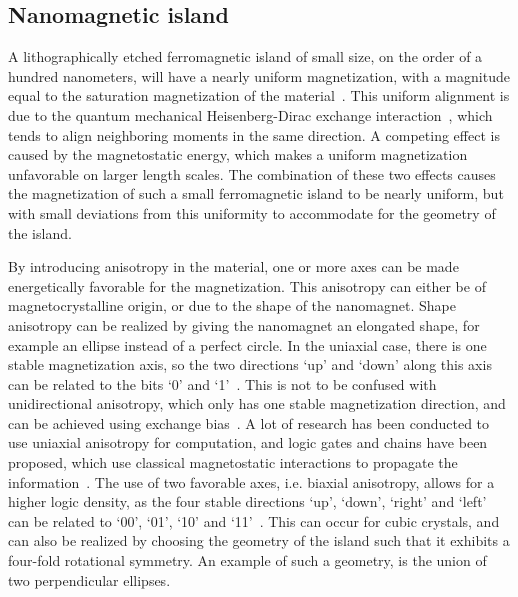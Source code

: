 \documentclass[11pt,a4paper,english,twoside]{article}
\begin{document}
\subsection{Nanomagnetic island}
A lithographically etched ferromagnetic island of small size, on the order of a hundred nanometers, will have a nearly uniform magnetization, with a magnitude equal to the saturation magnetization of the material~\cite{MQCA_RoomTemp,NML_Carlton}. This uniform alignment is due to the quantum mechanical Heisenberg-Dirac exchange interaction~\cite{MuMax3_advances, heisenberg1928theorie}, which tends to align neighboring moments in the same direction. A competing effect is caused by the magnetostatic energy, which makes a uniform magnetization unfavorable on larger length scales. The combination of these two effects causes the magnetization of such a small ferromagnetic island to be nearly uniform, but with small deviations from this uniformity to accommodate for the geometry of the island. \par
By introducing anisotropy in the material, one or more axes can be made energetically favorable for the magnetization. This anisotropy can either be of magnetocrystalline origin, or due to the shape of the nanomagnet. Shape anisotropy can be realized by giving the nanomagnet an elongated shape, for example an ellipse instead of a perfect circle. In the uniaxial case, there is one stable magnetization axis, so the two directions `up' and `down' along this axis can be related to the bits `0' and `1'~\cite{MQCA_RoomTemp}. This is not to be confused with unidirectional anisotropy, which only has one stable magnetization direction, and can be achieved using exchange bias~\cite{ExchangeBias_Mechanisms,ExchangeBias_nanostructures,ExchangeBias}. A lot of research has been conducted to use uniaxial anisotropy for computation, and logic gates and chains have been proposed, which use classical magnetostatic interactions to propagate the information~\cite{GYP-18,MQCA_MajorityGate,SwitchingForced_EnergyEfficient}. The use of two favorable axes, i.e. biaxial anisotropy, allows for a higher logic density, as the four stable directions `up', `down', `right' and `left' can be related to `00', `01', `10' and `11'~\cite{MQCA_ImageRecognition}. This can occur for cubic crystals, and can also be realized by choosing the geometry of the island such that it exhibits a four-fold rotational symmetry. An example of such a geometry, is the union of two perpendicular ellipses.
\end{document}
